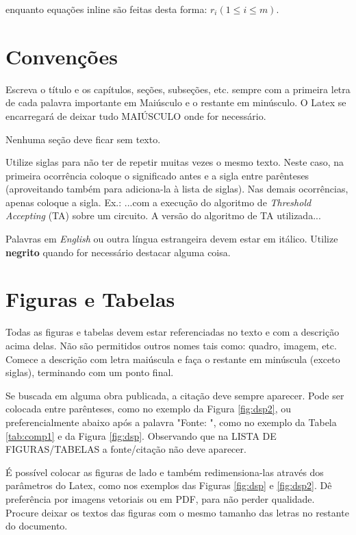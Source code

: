 enquanto equações inline são feitas desta forma: $r_i (1\leq i \leq m)$.

\section{Convenções}
Escreva o título e os capítulos, seções, subseções, etc. sempre com a primeira letra de cada palavra importante em Maiúsculo e o restante em minúsculo. O Latex se encarregará de deixar tudo MAIÚSCULO onde for necessário.

Nenhuma seção deve ficar sem texto.

Utilize siglas para não ter de repetir muitas vezes o mesmo texto. Neste caso, na primeira ocorrência coloque o significado antes e a sigla entre parênteses (aproveitando também para adiciona-la à lista de siglas). Nas demais ocorrências, apenas coloque a sigla. 
Ex.: ...com a execução do algoritmo de \textit{Threshold Accepting} (TA) sobre um circuito. A versão do algoritmo de TA utilizada...

Palavras em \textit{English} ou outra língua estrangeira devem estar em itálico. Utilize \textbf{negrito} quando for necessário destacar alguma coisa.

\section{Figuras e Tabelas}

Todas as figuras e tabelas devem estar referenciadas no texto e com a descrição acima delas. Não são permitidos outros nomes tais como: quadro, imagem, etc. Comece a descrição com letra maiúscula e faça o restante em minúscula (exceto siglas), terminando com um ponto final.

Se buscada em alguma obra publicada, a citação deve sempre aparecer. Pode ser colocada entre parênteses, como no exemplo da Figura \ref{fig:dsp2}, ou preferencialmente abaixo após a palavra "Fonte: ", como no exemplo da Tabela \ref{tab:comp1} e da Figura \ref{fig:dsp}. Observando que na LISTA DE FIGURAS/TABELAS a fonte/citação não deve aparecer.

É possível colocar as figuras de lado e também redimensiona-las através dos parâmetros do Latex, como nos exemplos das Figuras \ref{fig:dsp} e \ref{fig:dsp2}. Dê preferência por imagens vetoriais ou em PDF, para não perder qualidade. Procure deixar os textos das figuras com o mesmo tamanho das letras no restante do documento.

